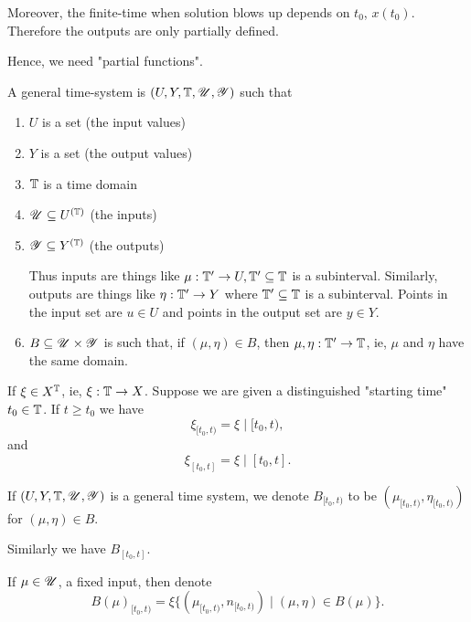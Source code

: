 Moreover, the finite-time when solution blows up depends on $t_{0}$, $x(t_{0})$. Therefore the outputs are only partially defined. 

Hence, we need "partial functions".

\begin{definition}
	A general time-system is $(U, Y, \mathbb{T}, \mathscr{U}, \mathscr{Y})$ such that 
	\begin{enumerate}
		\item $U$ is a set (the input values)
		\item $Y$ is a set (the output values)
		\item $\mathbb{T}$ is a time domain
		\item $\mathscr{U} \subseteq U^{(\mathbb{T})}$ (the inputs)
		\item $\mathscr{Y} \subseteq Y^{(\mathbb{T})}$ (the outputs)

		Thus inputs are things like $\mu : \mathbb{T}' \to U, \mathbb{T}' \subseteq \mathbb{T}$ is a subinterval. Similarly, outputs are things like $\eta : \mathbb{T}' \to Y$ where $\mathbb{T}' \subseteq \mathbb{T}$ is a subinterval. Points in the input set are $u \in  U$ and points in the output set are $y \in Y$. 
	\item $B \subseteq \mathscr{U} \times  \mathscr{Y}$ is such that, if $(\mu , \eta) \in  B$, then $\mu, \eta : \mathbb{T}' \to \mathbb{T}$, ie, $\mu$ and $\eta$ have the same domain. 

	\end{enumerate}
\end{definition}

\begin{notation}
	If $\xi \in X^{\mathbb{T}}$, ie, $\xi : \mathbb{T} \to X$. Suppose we are given a distinguished "starting time" $t_{0}  \in  \mathbb{T}$. If $t \ge t_{0}$ we have \[
	\xi_{[t_{0}, t)} = \xi  \mid [t_{0}, t)
	,\]  
	and \[
	\xi_{[t_{0}, t]} = \xi  \mid [t_{0}, t]
	.\] 
\end{notation}


If $(U, Y, \mathbb{T}, \mathscr{U}, \mathscr{Y})$ is a general time system, we denote $B_{[t_{0}, t)}$ to be $(\mu _{[t_{0}, t)}, \eta_{[t_{0}, t)})$ for $(\mu , \eta) \in  B$. 

Similarly we have $B_{[t_{0}, t]}$. 

If $\mu \in \mathscr{U}$, a fixed input, then denote
\[
B(\mu ) _{[t_{0}, t)} = \xi\{(\mu _{[t_{0}, t)}, n _{[t_{0}, t)})  \mid (\mu , \eta) \in  B( \mu ) \}
.\] 


